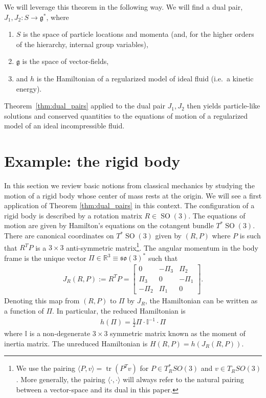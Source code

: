 \documentclass[12pt]{amsart}
\newcommand{\so}{\ensuremath{\mathfrak{so}}}
\DeclareMathOperator{\SO}{SO}
\DeclareMathOperator{\tr}{tr}
\begin{document}
We will leverage this theorem in the following way.
We will find a dual pair, $J_1,J_2: S \to \mathfrak{g}^*$, where
\begin{enumerate}
\item $S$ is the space of particle locations and momenta (and, for the higher orders of the hierarchy, internal group variables),
\item $\mathfrak{g}$ is the space of vector-fields,
\item and $h$ is the Hamiltonian of a regularized model of ideal fluid (i.e.\ a kinetic energy).
\end{enumerate}
Theorem~\ref{thm:dual_pairs} applied to the dual pair $J_1,J_2$
then yields particle-like solutions and conserved quantities to the equations of motion
of a regularized model of an ideal incompressible fluid.

\section{Example: the rigid body}
\label{sec:rigid_body}
  In this section we review basic notions from classical mechanics
by studying the motion of a rigid body whose center of mass rests
at the origin.
We will see a first application of Theorem \ref{thm:dual_pairs}
in this context.
The configuration of a rigid body is described by a
rotation matrix $R \in \SO(3)$.
The equations of motion are given by Hamilton's equations
on the cotangent bundle $T^*\SO(3)$.
There are canonical coordinates on $T^*\SO(3)$ given by $(R,P)$
where $P$ is such that $R^TP $ is a $3 \times 3$ anti-symmetric
matrix\footnote{%
  We use the pairing $\langle P, v \rangle = \tr(P^T v)$ for
  $P \in T^*_R SO(3)$ and $v \in T_R SO(3)$. More generally, the pairing $\langle \cdot , \cdot \rangle$ will always refer to the natural pairing between a vector-space and its dual in this paper.}.
The angular momentum in the body frame is the
unique vector $\Pi \in \mathbb{R}^3 \equiv \so(3)^*$ such that
\begin{align*}
  J_R(R,P) := R^TP = \begin{bmatrix}
    0 & -\Pi_3 & \Pi_2 \\
    \Pi_3 & 0 & -\Pi_1 \\
    -\Pi_2 & \Pi_1 & 0 
    \end{bmatrix}.
\end{align*}
Denoting this map from $(R,P)$ to $\Pi$ by $J_R$,
the Hamiltonian can be written as a function
of $\Pi$.  In particular, the reduced Hamiltonian is
\begin{align*}
  h(\Pi) = \frac{1}{2}\Pi \cdot \mathbb{I}^{-1} \cdot \Pi
\end{align*}
where $\mathbb{I}$ is a non-degenerate $3\times 3$ symmetric matrix
known as the moment of inertia matrix.
The unreduced Hamiltonian is $H(R,P) = h(J_R(R,P))$.
\end{document}
